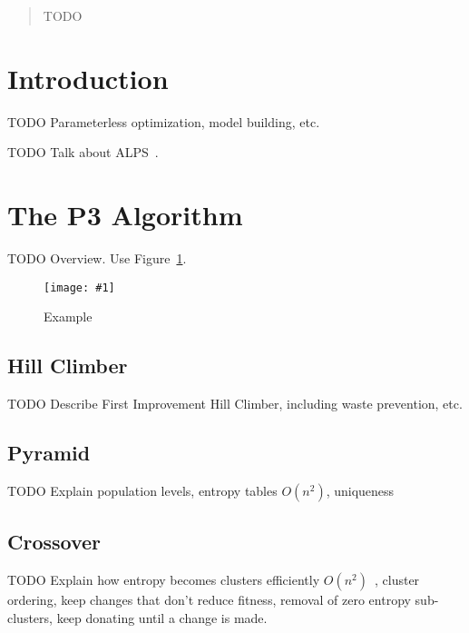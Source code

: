 \documentclass{sig-alternate}
\newcommand{\includegraphicsfit}[1]
{\texttt{[image: \#1]}}
\begin{document}
\maketitle
\begin{abstract}
TODO
\end{abstract}




\section{Introduction}
TODO Parameterless optimization, model building, etc.

TODO Talk about ALPS~\cite{hornby:2006:alps}.

\section{The P3 Algorithm}
TODO Overview.  Use Figure~\ref{fig-p3}.

\begin{figure}
  \centering
  \includegraphicsfit{P3_big_fail}
  \caption{Example}
  \label{fig-p3}
\end{figure}

\subsection{Hill Climber}
TODO Describe First Improvement Hill Climber, including waste prevention, etc.

\subsection{Pyramid}
TODO Explain population levels, entropy tables $O(n^2)$, uniqueness

\subsection{Crossover}
TODO Explain how entropy becomes clusters efficiently $O(n^2)$~\cite{gronau:2007:upgma}, cluster ordering,
keep changes that don't reduce fitness, removal of zero entropy sub-clusters,
keep donating until a change is made.
\end{document}
